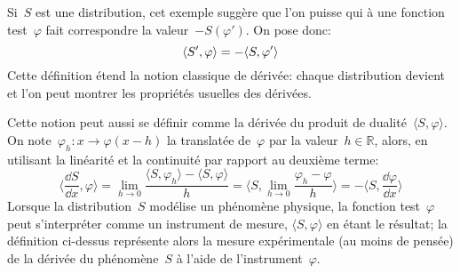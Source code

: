 \medskip
\begin{definition}\label{Def-DerivDistrib}
Si~$S$ est une distribution, cet exemple suggère que l'on puisse  qui à une fonction test~$\varphi$ fait correspondre la valeur~$- S(\varphi')$. On pose donc:
\begin{equation}\colorred
  \langle S', \varphi \rangle = - \langle S, \varphi' \rangle
\end{equation}
Cette définition étend la notion classique de dérivée: chaque distribution devient  et l'on peut montrer les propriétés usuelles des dérivées.
\end{definition}

\medskip
Cette notion peut aussi se définir comme la dérivée du produit de dualité~$\langle S,\varphi\rangle$.
On note~$\varphi_h:x\rightarrow\varphi(x-h)$ la translatée de~$\varphi$ par la valeur~$h\in{\mathbb R}$, alors, en utilisant la linéarité et la continuité par rapport au deuxième terme:
\begin{equation}
\langle\frac{\dd S}{\dd x},\varphi\rangle= \lim_{h\rightarrow 0}\frac{ \langle S,\varphi_h\rangle- \langle S,\varphi\rangle}{h}
= \langle S,\lim_{h\rightarrow 0} \frac{\varphi_h-\varphi}{h} \rangle= -\langle S,\frac{\dd\varphi}{\dd x}\rangle
\end{equation}
Lorsque la distribution~$S$ modélise un phénomène physique, la fonction test~$\varphi$ peut s'interpréter comme un instrument de mesure, $\langle S,\varphi\rangle$ en étant le résultat; la définition ci-dessus représente alors la mesure expérimentale (au moins de pensée) de la dérivée du phénomène~$S$ à l'aide de l'instrument~$\varphi$.

\medskip
{}

